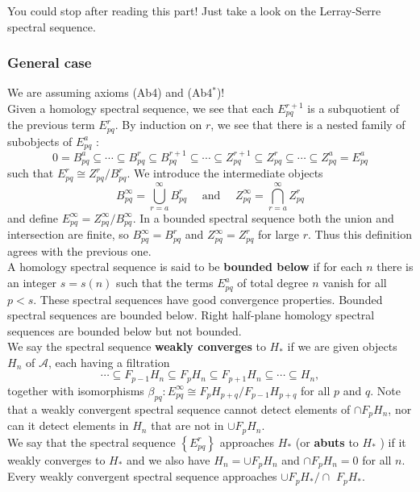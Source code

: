 You could stop after reading this part! Just take a look on the Lerray-Serre spectral sequence.\\


\subsubsection{General case}

We are assuming axioms (Ab4) and (Ab4$^*$)!\\

Given a homology spectral sequence, we see that each $E_{p q}^{r+1}$ is a subquotient of the previous term $E_{p q}^r$. By induction on $r$, we see that there is a nested family of subobjects of $E_{p q}^a$ :
$$
0=B_{p q}^a \subseteq \cdots \subseteq B_{p q}^r \subseteq B_{p q}^{r+1} \subseteq \cdots \subseteq Z_{p q}^{r+1} \subseteq Z_{p q}^r \subseteq \cdots \subseteq Z_{p q}^a=E_{p q}^a
$$
such that $E_{p q}^r \cong Z_{p q}^r / B_{p q}^r$. We introduce the intermediate objects
$$
B_{p q}^{\infty}=\bigcup_{r=a}^{\infty} B_{p q}^r \quad \text { and } \quad Z_{p q}^{\infty}=\bigcap_{r=a}^{\infty} Z_{p q}^r
$$
and define $E_{p q}^{\infty}=Z_{p q}^{\infty} / B_{p q}^{\infty}$. In a bounded spectral sequence both the union and intersection are finite, so $B_{p q}^{\infty}=B_{p q}^r$ and $Z_{p q}^{\infty}=Z_{p q}^r$ for large $r$. Thus this definition agrees with the previous one.\\
A homology spectral sequence is said to be \textbf{bounded below }if for each $n$ there is an integer $s=s(n)$ such that the terms $E_{p q}^a$ of total degree $n$ vanish for all $p<s$. These spectral sequences have good convergence properties. Bounded spectral sequences are bounded below. Right half-plane homology spectral sequences are bounded below but not bounded.\\

We say the spectral sequence \textbf{weakly converges} to $H_*$ if we are given objects $H_n$ of $\mathcal{A}$, each having a filtration
$$
\cdots \subseteq F_{p-1} H_n \subseteq F_p H_n \subseteq F_{p+1} H_n \subseteq \cdots \subseteq H_n,
$$
together with isomorphisms $\beta_{p q}: E_{p q}^{\infty} \cong F_p H_{p+q} / F_{p-1} H_{p+q}$ for all $p$ and $q$. Note that a weakly convergent spectral sequence cannot detect elements of $\cap F_p H_n$, nor can it detect elements in $H_n$ that are not in $\cup F_p H_n$.\\
We say that the spectral sequence $\left\{E_{p q}^r\right\}$ approaches $H_*$ (or \textbf{abuts} to $H_*$ ) if it weakly converges to $H_*$ and we also have $H_n=\cup F_p H_n$ and $\cap F_p H_n=0$ for all $n$. Every weakly convergent spectral sequence approaches $\cup F_p H_* / \cap$ $F_p H_*$.\\

